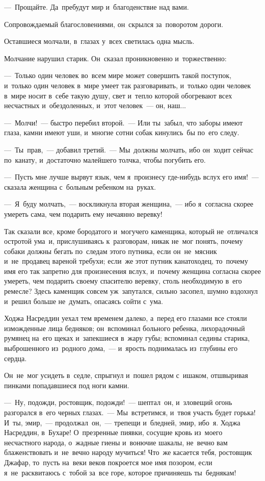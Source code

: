 \documentclass[12pt,a4paper]{book}
\begin{document}
—~Прощайте. Да~пребудут мир и~благоденствие над вами.

Сопровождаемый благословениями, он~скрылся за~поворотом дороги.

Оставшиеся молчали, в~глазах у~всех светилась одна мысль.

Молчание нарушил старик. Он~сказал проникновенно и~торжественно:

—~Только один человек во~всем мире может совершить такой поступок, и~только один человек в~мире умеет так разговаривать, и~только один человек в~мире носит в~себе такую душу, свет и~тепло которой обогревают всех несчастных и~обездоленных, и~этот человек~— он, наш...

—~Молчи!~— быстро перебил второй.~— Или ты~забыл, что заборы имеют глаза, камни имеют уши, и~многие сотни собак кинулись~бы по~его следу.

—~Ты~прав,~— добавил третий.~— Мы~должны молчать, ибо он~ходит сейчас по~канату, и~достаточно малейшего толчка, чтобы погубить его.

—~Пусть мне лучше вырвут язык, чем я~произнесу где-нибудь вслух его имя!~— сказала женщина с~больным ребенком на~руках.

—~Я~буду молчать,~— воскликнула вторая женщина,~— ибо я~согласна скорее умереть сама, чем подарить ему нечаянно веревку!

Так сказали все, кроме бородатого и~могучего каменщика, который не~отличался остротой ума~и, прислушиваясь к~разговорам, никак не~мог понять, почему собаки должны бегать по~следам этого путника, если он~не~мясник и~не~продавец вареной требухи; если~же этот путник канатоходец, то~почему имя его так запретно для произнесения вслух, и~почему женщина согласна скорее умереть, чем подарить своему спасителю веревку, столь необходимую в~его ремесле? Здесь каменщик совсем уж~запутался, сильно засопел, шумно вздохнул и~решил больше не~думать, опасаясь сойти с~ума.

Ходжа Насреддин уехал тем временем далеко, а~перед его глазами все стояли изможденные лица бедняков; он~вспоминал больного ребенка, лихорадочный румянец на~его щеках и~запекшиеся в~жару губы; вспоминал седины старика, выброшенного из~родного дома,~— и~ярость поднималась из~глубины его сердца.

Он~не~мог усидеть в~седле, спрыгнул и~пошел рядом с~ишаком, отшвыривая пинками попадавшиеся под ноги камни.

—~Ну, подожди, ростовщик, подожди!~— шептал~он, и~зловещий огонь разгорался в~его черных глазах.~— Мы~встретимся, и~твоя участь будет горька! И~ты, эмир,~— продолжал~он,~— трепещи и~бледней, эмир, ибо~я. Ходжа Насреддин, в~Бухаре! О~презренные пиявки, сосущие кровь из~моего несчастного народа, о~жадные гиены и~вонючие шакалы, не~вечно вам блаженствовать и~не~вечно народу мучиться! Что~же касается тебя, ростовщик Джафар, то~пусть на~веки веков покроется мое имя позором, если я~не~расквитаюсь с~тобой за~все горе, которое причиняешь ты~беднякам!
\end{document}
